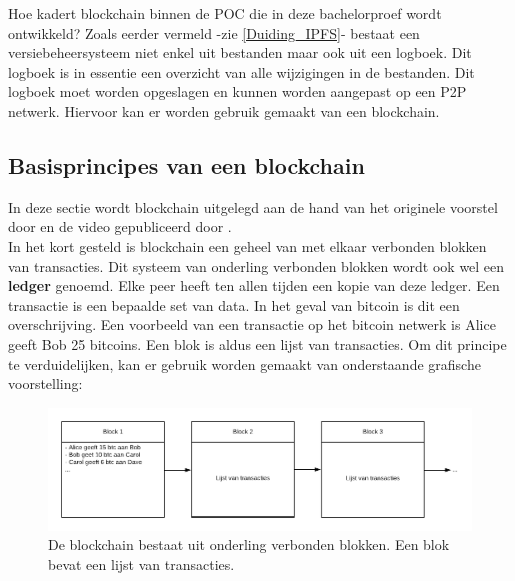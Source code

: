 Hoe kadert blockchain binnen de POC die in deze bachelorproef wordt ontwikkeld? Zoals eerder vermeld -zie \ref{Duiding_IPFS}- bestaat een versiebeheersysteem niet enkel uit bestanden maar ook uit een logboek. Dit logboek is in essentie een overzicht van alle wijzigingen in de bestanden. Dit logboek moet worden opgeslagen en kunnen worden aangepast op een P2P netwerk. Hiervoor kan er worden gebruik gemaakt van een blockchain.\\

\subsection{Basisprincipes van een blockchain}
In deze sectie wordt blockchain uitgelegd aan de hand van het originele voorstel door \textcite{Satoshi2009} en de video gepubliceerd door \textcite{Blue2017}.\\

In het kort gesteld is blockchain een geheel van met elkaar verbonden blokken van transacties. Dit systeem van onderling verbonden blokken wordt ook wel een \textbf{ledger} genoemd. Elke peer heeft ten allen tijden een kopie van deze ledger. Een transactie is een bepaalde set van data. In het geval van bitcoin is dit een overschrijving. Een voorbeeld van een transactie op het bitcoin netwerk is Alice geeft Bob 25 bitcoins. Een blok is aldus een lijst van transacties. Om dit principe te verduidelijken, kan er gebruik worden gemaakt van onderstaande grafische voorstelling:\\

\begin{figure}[h!]
	\centering
		\includegraphics[scale=0.4]{blockchain-1.png}
	\caption[Blockchain - Voorstelling 1]{De blockchain bestaat uit onderling verbonden blokken. Een blok bevat een lijst van transacties.}
	\label{blocks}
\end{figure}

